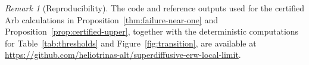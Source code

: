 \documentclass[11pt]{article}
\numberwithin{equation}{section}
\theoremstyle{remark}
\newtheorem{remark}[theorem]{Remark}
\begin{document}


\begin{remark}[Reproducibility]\label{rem:reproducibility}
The code and reference outputs used for the certified Arb calculations in
Proposition~\ref{thm:failure-near-one} and Proposition~\ref{prop:certified-upper},
together with the deterministic computations for Table~\ref{tab:thresholds}
and Figure~\ref{fig:transition}, are available at
\url{https://github.com/heliotrinas-alt/superdiffusive-erw-local-limit}.
\end{remark}
\end{document}
